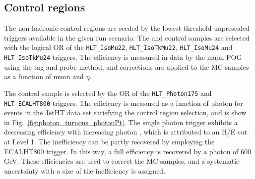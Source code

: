 
\subsection{Control regions\label{sec:control_samples}}




The non-hadronic control regions are seeded by the lowest-threshold unprescaled 
triggers available in the given run scenario. The 
\mj and \mmj control samples are selected with the logical OR of the \verb!HLT_IsoMu22!, 
\verb!HLT_IsoTkMu22!, \verb!HLT_IsoMu24! and \verb!HLT_IsoTkMu24! triggers.
The efficiency is measured in data by the muon POG using the tag and probe method,
and corrections are applied to the MC samples as a function of muon \Pt and $\eta$.

The \gj control sample is selected by the OR of the \verb!HLT_Photon175! and
\verb!HLT_ECALHT800! triggers. The efficiency is measured as a function of photon
\Pt %
for events in the JetHT data set satisfying the \gj control region selection,
and is show in Fig.~\ref{fig:photon_turnons_photonPt}. %
The single photon trigger exhibits a decreasing efficiency
with increasing photon \Pt, which is attributed to an H/E cut at Level 1. The inefficiency
can be partly recovered by employing the ECALHT800 trigger. In this way, a full efficiency
is recovered by a photon \Pt of 600 GeV. %
These efficiencies are used
to correct the MC samples, and a systematic uncertainty with a size of the 
inefficiency is assigned.

